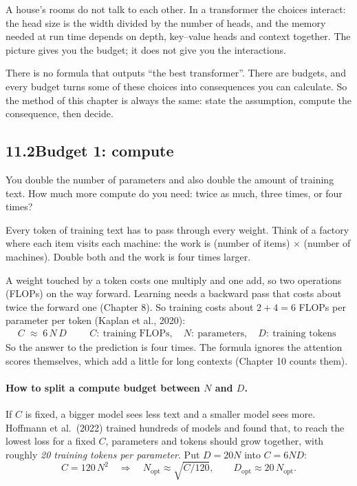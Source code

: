 \begin{breaks}
A house's rooms do not talk to each other. In a transformer the choices interact: the head size is the
width divided by the number of heads, and the memory needed at run time depends on depth, key--value heads
and context together. The picture gives you the budget; it does not give you the interactions.
\end{breaks}

\Why There is no formula that outputs ``the best transformer''. There are budgets, and every budget
turns some of these choices into consequences you can calculate. So the method of this chapter is
always the same: state the assumption, compute the consequence, then decide.


\subsection*{11.2\quad Budget 1: compute}

\Predict You double the number of parameters and also double the amount of training text. How much more
compute do you need: twice as much, three times, or four times?

\Picture Every token of training text has to pass through every weight. Think of a factory where each
item visits each machine: the work is (number of items) $\times$ (number of machines). Double both and
the work is four times larger.

\Exactly A weight touched by a token costs one multiply and one add, so two operations (FLOPs) on the
way forward. Learning needs a backward pass that costs about twice the forward one (Chapter 8). So
training costs about $2+4=6$ FLOPs per parameter per token (Kaplan et al., 2020):
\[
C \;\approx\; 6\,N\,D \qquad
\begin{array}{l}\scriptstyle C:\ \text{training FLOPs},\quad N:\ \text{parameters},\quad D:\ \text{training tokens}\end{array}
\]
So the answer to the prediction is four times. The formula ignores the attention scores themselves,
which add a little for long contexts (Chapter 10 counts them).

\paragraph{How to split a compute budget between $N$ and $D$.} If $C$ is fixed, a bigger model sees less
text and a smaller model sees more. Hoffmann et al.\ (2022) trained hundreds of models and found that,
to reach the lowest loss for a fixed $C$, parameters and tokens should grow together, with roughly
\emph{20 training tokens per parameter}. Put $D=20N$ into $C=6ND$:
\[
C = 120\,N^2 \quad\Longrightarrow\quad N_{\text{opt}} \approx \sqrt{C/120}, \qquad D_{\text{opt}} \approx 20\,N_{\text{opt}}.
\]

